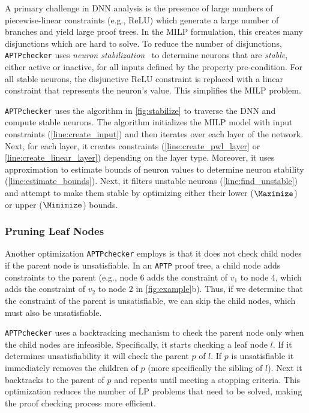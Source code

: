 \documentclass[oneside,11pt,dvipsnames]{book}
\newcommand{\nnproofchecker}{\texttt{APTPchecker}}
\newcommand{\nnproofformat}{\texttt{APTP}}
\begin{document}
A primary challenge in DNN analysis is the presence of large numbers of piecewise-linear constraints (e.g., ReLU) which generate a large number of branches and yield large proof trees. In the MILP formulation, this creates many disjunctions which are hard to solve. To reduce the number of disjunctions, \nnproofchecker{} uses \emph{neuron stabilization}~\cite{duong2024harnessing}
to determine neurons that are \emph{stable}, either active or inactive, for all inputs defined by the property pre-condition.
For all stable neurons, the disjunctive ReLU constraint is replaced with a linear constraint that represents the neuron's value.   This simplifies the MILP problem.

\nnproofchecker{} uses the algorithm in \autoref{fig:stabilize} to traverse the DNN and compute stable neurons. The algorithm initializes the MILP model with input constraints (\autoref{line:create_input}) and then iterates over each layer of the network. 
Next, for each layer, it creates constraints (\autoref{line:create_pwl_layer} or \autoref{line:create_linear_layer}) depending on the layer type.
Moreover,  it uses approximation to estimate bounds of neuron values to determine neuron stability (\autoref{line:estimate_bounds}).
Next, it filters unstable neurons (\autoref{line:find_unstable}) and attempt to make them stable by optimizing either their lower ($\Maximize$) or upper ($\Minimize$) bounds.



\subsubsection{Pruning Leaf Nodes}\label{sec:pruning}

Another optimization \nnproofchecker{} employs is that it does not check child nodes if the parent node is unsatisfiable.
In an \nnproofformat{} proof tree, a child node adds constraints to the parent (e.g., node 6 adds the constraint of $v_1$ to node 4, which adds the constraint of $v_2$ to node 2 in \autoref{fig:example}b). Thus, if we determine that the constraint of the parent is unsatisfiable, we can skip the child nodes, which must also be unsatisfiable.  


\nnproofchecker{} uses a backtracking mechanism to check the parent node only when the child nodes are infeasible. Specifically, it starts checking a leaf node $l$. If it determines unsatisfiability it will check the parent $p$ of $l$. If $p$ is unsatisfiable it immediately removes the children of $p$ (more specifically the sibling of $l$). Next it backtracks to the parent of $p$ and repeats until meeting a stopping criteria. This optimization reduces the number of LP problems that need to be solved, making the proof checking process more efficient. 
\end{document}
